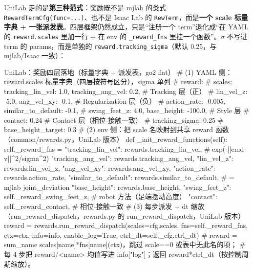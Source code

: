 UniLab 走的是\textbf{第三种范式}：奖励既不是 mjlab 的类式 \verb|RewardTermCfg(func=...)|、也不是 Isaac Lab 的 \verb|RewTerm|，而是\textbf{一个 scale 标量字典 + 一张派发表}。四层框架仍然成立，只是“注册一个 term”退化成“在 YAML 的 \verb|reward.scales| 里加一行 + 在 env 的 \verb|_reward_fns| 里挂一个函数”。$\sigma$ 不写进 term 的 params，而是单独的 \verb|reward.tracking_sigma|（默认 0.25，与 mjlab/Isaac 一致）：

\begin{codebox}[Python]{UniLab：奖励四层落地（标量字典 + 派发表，go2 flat）}
# (1) YAML 侧：reward.scales 标量字典（四层按符号区分），sigma 单列
# reward:
#   scales: {tracking_lin_vel: 1.0, tracking_ang_vel: 0.2,   # Tracking 层（正）
#            lin_vel_z: -5.0, ang_vel_xy: -0.1,              # Regularization 层（负）
#            action_rate: -0.005, similar_to_default: -0.1,
#            swing_feet_z: 4.0, base_height: -100.0,         # Style 层
#            contact: 0.24}                                  # Contact 层（相位-接触一致）
#   tracking_sigma: 0.25
#   base_height_target: 0.3
# (2) env 侧：把 scale 名映射到共享 reward 函数（common/rewards.py，UniLab 版本）
def _init_reward_functions(self):
    self._reward_fns = {
        "tracking_lin_vel":    rewards.tracking_lin_vel,      # exp(-||cmd-v||^2/sigma^2)
        "tracking_ang_vel":    rewards.tracking_ang_vel,
        "lin_vel_z":           rewards.lin_vel_z,
        "ang_vel_xy":          rewards.ang_vel_xy,
        "action_rate":         rewards.action_rate,
        "similar_to_default":  rewards.similar_to_default,    # = mjlab joint_deviation
        "base_height":         rewards.base_height,
        "swing_feet_z":        self._reward_swing_feet_z,      # robot 方法（足端摆动高度）
        "contact":             self._reward_contact,          # 相位-接触一致
    }
# (3) 每步派发 + dt 缩放（run_reward_dispatch，rewards.py 的 run_reward_dispatch，UniLab 版本）
reward = rewards.run_reward_dispatch(scales=cfg.scales, fns=self._reward_fns,
                                     ctx=ctx, info=info, enable_log=True,
                                     ctrl_dt=self._cfg.ctrl_dt)
#   reward = sum_name scales[name]*fns[name](ctx)，跳过 scale==0 或表中无此名的项；
#   每 4 步把 reward/<name> 均值写进 info["log"]；返回 reward*ctrl_dt（按控制周期缩放）。
\end{codebox}

